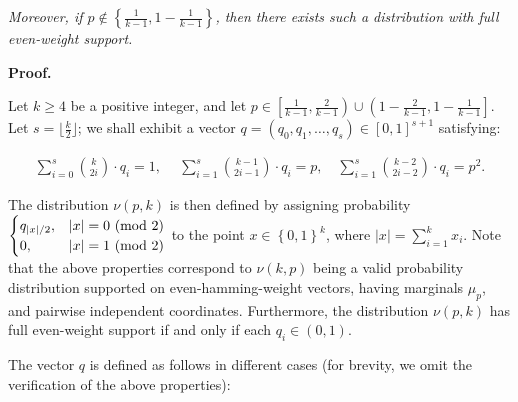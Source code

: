 \emph{Moreover, if $p\not\in\left\{\frac{1}{k-1},1-\frac{1}{k-1}\right\}$, then there exists such a distribution with full even-weight support.}\par






\par\medskip\noindent\textbf{Proof.}\par




Let $k\geqslant 4$ be a positive integer, and let $p\in\left[\frac{1}{k-1},\frac{2}{k-1}\right)\cup\left(1-\frac{2}{k-1},1-\frac{1}{k-1}\right]$.
Let $s=\lfloor\frac{k}{2}\rfloor$; we shall exhibit a vector $q=(q_{0},q_{1},\dots,q_{s})\in[0,1]^{s+1}$ satisfying:\par


\[\begin{gathered}
\sum_{i=0}^{s}\binom{k}{2i}\cdot q_{i}=1,\ \quad\sum_{i=1}^{s}\binom{k-1}{2i-1}\cdot q_{i}=p,\quad\sum_{i=1}^{s}\binom{k-2}{2i-2}\cdot q_{i}=p^{2}.
\end{gathered}\]


The distribution $\nu(p,k)$ is then defined by assigning probability $\begin{cases}q_{\left|x\right|/2},&\left|x\right|=0\textnormal{ (mod 2)}\\
0,&\left|x\right|=1\textnormal{ (mod 2)}\end{cases}$ to the point $x\in\left\{0,1\right\}^{k}$, where $\left|x\right|=\sum_{i=1}^{k}x_{i}$.
Note that the above properties correspond to $\nu(k,p)$ being a valid probability distribution supported on even-hamming-weight vectors, having marginals $\mu_{p}$, and pairwise independent coordinates.
Furthermore, the distribution $\nu(p,k)$ has full even-weight support if and only if each $q_{i}\in(0,1)$.\par




The vector $q$ is defined as follows in different cases (for brevity, we omit the verification of the above properties):\par


